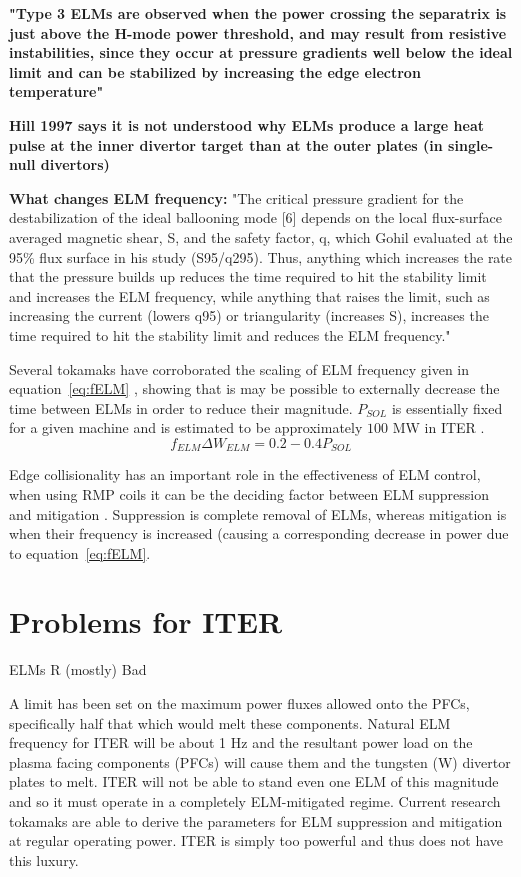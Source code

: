 \documentclass[12pt]{article}  %
\begin{document}
\textbf{"Type 3 ELMs are observed when the power crossing the separatrix is just above the H-mode power threshold, and may result from resistive instabilities, since they occur at pressure gradients well below the ideal limit and can be stabilized by increasing the edge electron temperature"} \cite{Hill1997}

\textbf{Hill 1997 \cite{Hill1997} says it is not understood why ELMs produce a large heat pulse at the inner divertor target than at the outer plates (in single-null divertors)}

\textbf{What changes ELM frequency:}
"The critical pressure gradient for the destabilization of the ideal ballooning mode [6] depends on the local flux-surface averaged magnetic shear, S, and the safety factor, q, which Gohil evaluated at the 95\% flux surface in his study (S95/q295). Thus, anything which increases the rate that the pressure builds up reduces the time required to hit the stability limit and increases the ELM frequency, while anything that raises the limit, such as increasing the current (lowers q95) or triangularity (increases S), increases the time required to hit the stability limit and reduces the ELM frequency."\cite{Hill1997}

Several tokamaks have corroborated the scaling of ELM frequency given in equation~\ref{eq:fELM} \cite{Leonard1999}\cite{Loarte2002}, showing that is may be possible to externally decrease the time between ELMs in order to reduce their magnitude. $P_{SOL}$ is essentially fixed for a given machine and is estimated to be approximately $100$ MW in ITER \cite{Eich2013}.
\begin{equation}\label{eq:fELM}
f_{ELM}\Delta W_{ELM} = 0.2-0.4 P_{SOL}
\end{equation}

Edge collisionality has an important role in the effectiveness of ELM control, when using RMP coils it can be the deciding factor between ELM suppression and mitigation \cite{Kirk2013}. Suppression is complete removal of ELMs, whereas mitigation is when their frequency is increased (causing a corresponding decrease in power due to equation~\ref{eq:fELM}.


\section{Problems for ITER}\label{sec:Problems}
ELMs R (mostly) Bad \cite{Connor2008}

A limit has been set on the maximum power fluxes allowed onto the PFCs, specifically half that which would melt these components.\cite{Loarte2014a} Natural ELM frequency for ITER will be about 1 Hz and the resultant power load on the plasma facing components (PFCs) will cause them and the tungsten (W) divertor plates to melt\cite{Federici2003}. ITER will not be able to stand even one ELM of this magnitude and so it must operate in a completely ELM-mitigated regime\cite{KirkFF}. Current research tokamaks are able to derive the parameters for ELM suppression and mitigation at regular operating power. ITER is simply too powerful and thus does not have this luxury.
\end{document}
